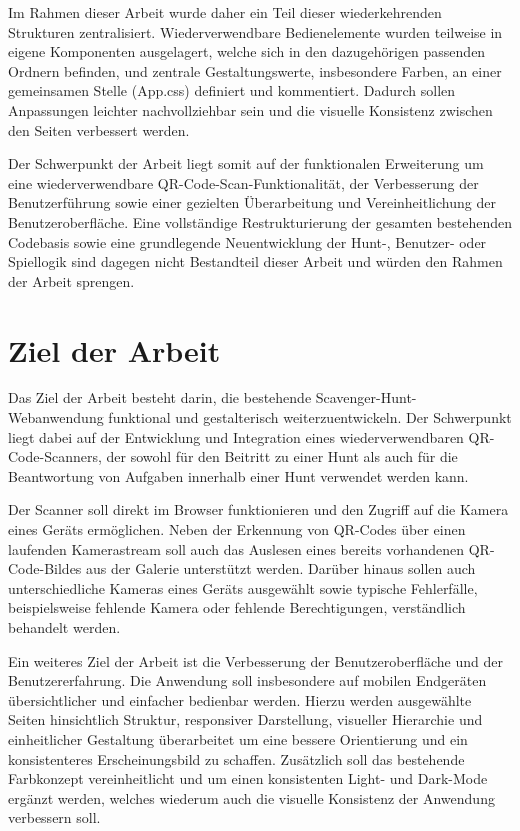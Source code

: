 ﻿\documentclass[oneside]{ausarbeitung}
\begin{document}
Im Rahmen dieser Arbeit wurde daher ein Teil dieser wiederkehrenden Strukturen zentralisiert. Wiederverwendbare Bedienelemente wurden teilweise
in eigene Komponenten ausgelagert, welche sich in den dazugehörigen passenden Ordnern befinden, und zentrale Gestaltungswerte, insbesondere Farben, 
an einer gemeinsamen Stelle (App.css) definiert und kommentiert. Dadurch sollen Anpassungen leichter nachvollziehbar sein und die visuelle Konsistenz 
zwischen den Seiten verbessert werden.

Der Schwerpunkt der Arbeit liegt somit auf der funktionalen Erweiterung um eine wiederverwendbare QR-Code-Scan-Funktionalität, der Verbesserung 
der Benutzerführung sowie einer gezielten Überarbeitung und Vereinheitlichung der Benutzeroberfläche. Eine vollständige Restrukturierung der gesamten 
bestehenden Codebasis sowie eine grundlegende Neuentwicklung der Hunt-, Benutzer- oder Spiellogik sind dagegen nicht Bestandteil dieser Arbeit und 
würden den Rahmen der Arbeit sprengen.

\section{Ziel der Arbeit}
\label{sec:ziel}

Das Ziel der Arbeit besteht darin, die bestehende Scavenger-Hunt-Webanwendung funktional und gestalterisch weiterzuentwickeln. Der Schwerpunkt liegt 
dabei auf der Entwicklung und Integration eines wiederverwendbaren QR-Code-Scanners, der sowohl für den Beitritt zu einer Hunt als auch für die 
Beantwortung von Aufgaben innerhalb einer Hunt verwendet werden kann.

Der Scanner soll direkt im Browser funktionieren und den Zugriff auf die Kamera eines Geräts ermöglichen. Neben der Erkennung von QR-Codes über 
einen laufenden Kamerastream soll auch das Auslesen eines bereits vorhandenen QR-Code-Bildes aus der Galerie unterstützt werden. Darüber hinaus 
sollen auch unterschiedliche Kameras eines Geräts ausgewählt sowie typische Fehlerfälle, beispielsweise fehlende Kamera oder fehlende Berechtigungen,
verständlich behandelt werden.

Ein weiteres Ziel der Arbeit ist die Verbesserung der Benutzeroberfläche und der Benutzererfahrung. Die Anwendung soll insbesondere auf mobilen 
Endgeräten übersichtlicher und einfacher bedienbar werden. Hierzu werden ausgewählte Seiten hinsichtlich Struktur, responsiver Darstellung, visueller 
Hierarchie und einheitlicher Gestaltung überarbeitet um eine bessere Orientierung und ein konsistenteres Erscheinungsbild zu schaffen. Zusätzlich soll
das bestehende Farbkonzept vereinheitlicht und um einen konsistenten Light- und Dark-Mode ergänzt werden, welches wiederum auch die visuelle Konsistenz 
der Anwendung verbessern soll.
\end{document}

